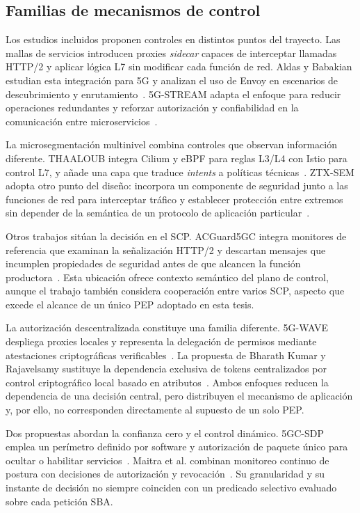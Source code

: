 \subsection{Familias de mecanismos de control}
\label{subsec:enfoques-control}

Los estudios incluidos proponen controles en distintos puntos del trayecto. Las mallas de servicios introducen proxies \textit{sidecar} capaces de interceptar llamadas HTTP/2 y aplicar lógica L7 sin modificar cada función de red. Aldas y Babakian estudian esta integración para 5G y analizan el uso de Envoy en escenarios de descubrimiento y enrutamiento~\cite{E0005}. 5G-STREAM adapta el enfoque para reducir operaciones redundantes y reforzar autorización y confiabilidad en la comunicación entre microservicios~\cite{E0004}.

La microsegmentación multinivel combina controles que observan información diferente. THAALOUB integra Cilium y eBPF para reglas L3/L4 con Istio para control L7, y añade una capa que traduce \textit{intents} a políticas técnicas~\cite{E0019}. ZTX-SEM adopta otro punto del diseño: incorpora un componente de seguridad junto a las funciones de red para interceptar tráfico y establecer protección entre extremos sin depender de la semántica de un protocolo de aplicación particular~\cite{E0045}.

Otros trabajos sitúan la decisión en el SCP. ACGuard5GC integra monitores de referencia que examinan la señalización HTTP/2 y descartan mensajes que incumplen propiedades de seguridad antes de que alcancen la función productora~\cite{E0061}. Esta ubicación ofrece contexto semántico del plano de control, aunque el trabajo también considera cooperación entre varios SCP, aspecto que excede el alcance de un único PEP adoptado en esta tesis.

La autorización descentralizada constituye una familia diferente. 5G-WAVE despliega proxies locales y representa la delegación de permisos mediante atestaciones criptográficas verificables~\cite{E0069}. La propuesta de Bharath Kumar y Rajavelsamy sustituye la dependencia exclusiva de tokens centralizados por control criptográfico local basado en atributos~\cite{E0012}. Ambos enfoques reducen la dependencia de una decisión central, pero distribuyen el mecanismo de aplicación y, por ello, no corresponden directamente al supuesto de un solo PEP.

Dos propuestas abordan la confianza cero y el control dinámico. 5GC-SDP emplea un perímetro definido por software y autorización de paquete único para ocultar o habilitar servicios~\cite{E0041}. Maitra et al. combinan monitoreo continuo de postura con decisiones de autorización y revocación~\cite{E0050}. Su granularidad y su instante de decisión no siempre coinciden con un predicado selectivo evaluado sobre cada petición SBA.

